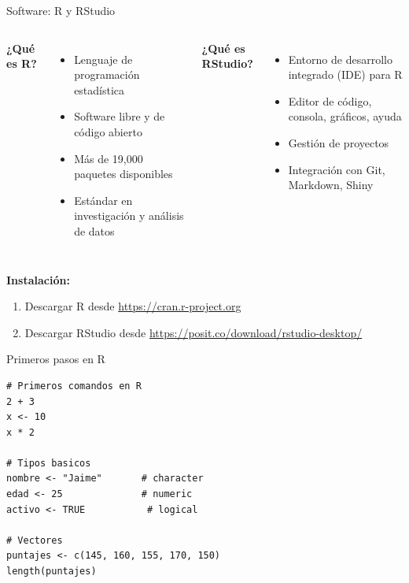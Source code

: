 \documentclass[aspectratio=169, 11pt]{beamer}
\begin{document}
\begin{frame}{Software: R y RStudio}
\begin{columns}[T]
\textbf{¿Qué es R?}
\begin{itemize}
\item Lenguaje de programación estadística
\item Software libre y de código abierto
\item Más de 19,000 paquetes disponibles
\item Estándar en investigación y análisis de datos
\end{itemize}

\textbf{¿Qué es RStudio?}
\begin{itemize}
\item Entorno de desarrollo integrado (IDE) para R
\item Editor de código, consola, gráficos, ayuda
\item Gestión de proyectos
\item Integración con Git, Markdown, Shiny
\end{itemize}
\end{columns}

\vspace{1em}
\textbf{Instalación:}
\begin{enumerate}
\item Descargar R desde \url{https://cran.r-project.org}
\item Descargar RStudio desde \url{https://posit.co/download/rstudio-desktop/}
\end{enumerate}
\end{frame}

\begin{frame}[fragile]{Primeros pasos en R}
\begin{lstlisting}
# Primeros comandos en R
2 + 3
x <- 10
x * 2

# Tipos basicos
nombre <- "Jaime"       # character
edad <- 25              # numeric
activo <- TRUE           # logical

# Vectores
puntajes <- c(145, 160, 155, 170, 150)
length(puntajes)
\end{lstlisting}
\end{frame}
\end{document}
